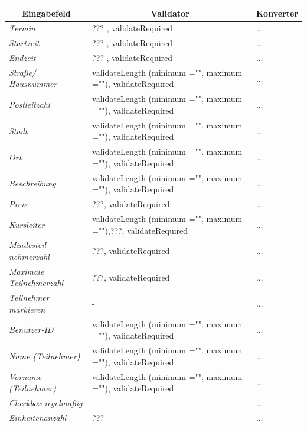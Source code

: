 \begin{itemize}
				\begin{center}
					\begin{longtable}{|p{3cm} |p{8cm} | p{5cm}|}
						
						\hline \multicolumn{1}{|c|}{\textbf{Eingabefeld}} & \multicolumn{1}{|c|}{\textbf{Validator}} & \multicolumn{1}{|c|}{\textbf{Konverter}} \\ \hline
						\endfirsthead
						\hline
						\endlastfoot
						\textit{Termin} & ??? , validateRequired & ... \\ \hline
						\textit{Startzeit} & ??? , validateRequired & ... \\ \hline
						\textit{Endzeit} & ??? , validateRequired & ... \\ \hline
						\textit{Straße/ Hausnummer} & validateLength (minimum ="", maximum =""), validateRequired & ... \\ \hline
						\textit{Postleitzahl} & validateLength (minimum ="", maximum =""), validateRequired & ... \\ \hline
						\textit{Stadt} & validateLength (minimum ="", maximum =""), validateRequired & ...  \\ \hline
						\textit{Ort} & validateLength (minimum ="", maximum =""), validateRequired & ...  \\ \hline
						\textit{Beschreibung} & validateLength (minimum ="", maximum =""), validateRequired & ... \\ \hline
						\textit{Preis} & ???, validateRequired  & ... \\ \hline
						\textit{Kursleiter} & validateLength (minimum ="", maximum =""),???, validateRequired & ...  \\ \hline
						\textit{Mindesteil- nehmerzahl} & ???, validateRequired & ... \\ \hline
						\textit{Maximale Teilnehmerzahl} & ???, validateRequired & ... \\ \hline
						\textit{Teilnehmer markieren} & - & ... \\ \hline
						\textit{Benutzer-ID} & validateLength (minimum ="", maximum =""), validateRequired & ... \\ \hline
						\textit{Name (Teilnehmer)} & validateLength (minimum ="", maximum =""), validateRequired & ... \\ \hline
						\textit{Vorname (Teilnehmer)} & validateLength (minimum ="", maximum =""), validateRequired & ... \\ \hline
						\textit{Checkbox regelmäßig} & - & ... \\ \hline
						\textit{Einheitenanzahl} & ??? & ... \\ \hline
					\end{longtable}
				\end{center}
				

\end{itemize}
